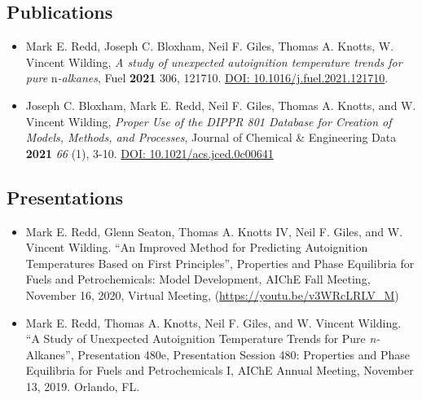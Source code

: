 \hypertarget{publications}{%
\subsection{Publications}\label{publications}}


\begin{itemize}
\tightlist
\item
  Mark E. Redd, Joseph C. Bloxham, Neil F. Giles, Thomas A. Knotts, W.
  Vincent Wilding, \emph{A study of unexpected autoignition temperature
  trends for pure} n\emph{-alkanes}, Fuel \textbf{2021} 306, 121710.
  \href{https://doi.org/10.1016/j.fuel.2021.121710}{DOI:
  10.1016/j.fuel.2021.121710}.
\item
  Joseph C. Bloxham, Mark E. Redd, Neil F. Giles, Thomas A. Knotts, and
  W. Vincent Wilding, \emph{Proper Use of the DIPPR 801 Database for
  Creation of Models, Methods, and Processes}, Journal of Chemical \&
  Engineering Data \textbf{2021} \emph{66} (1), 3-10.
  \href{https://doi.org/10.1021/acs.jced.0c00641}{DOI:
  10.1021/acs.jced.0c00641}
\end{itemize}

\hypertarget{presentations}{%
\subsection{Presentations}\label{presentations}}

\begin{itemize}
\tightlist
\item
  Mark E. Redd, Glenn Seaton, Thomas A. Knotts IV, Neil F. Giles, and W.
  Vincent Wilding. ``An Improved Method for Predicting Autoignition
  Temperatures Based on First Principles'', Properties and Phase
  Equilibria for Fuels and Petrochemicals: Model Development, AIChE Fall
  Meeting, November 16, 2020, Virtual Meeting,
  (\url{https://youtu.be/v3WRcLRLV_M})
\item
  Mark E. Redd, Thomas A. Knotts, Neil F. Giles, and W. Vincent Wilding.
  ``A Study of Unexpected Autoignition Temperature Trends for Pure
  \emph{n-}Alkanes'', Presentation 480e, Presentation Session 480:
  Properties and Phase Equilibria for Fuels and Petrochemicals I, AIChE
  Annual Meeting, November 13, 2019. Orlando, FL.
\end{itemize}
